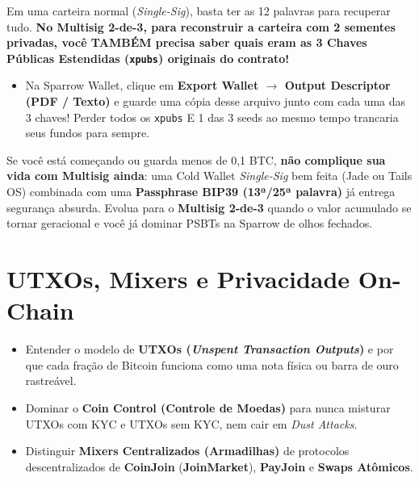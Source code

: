 \documentclass{pousadaguide}
\begin{document}
\begin{perigo}
Em uma carteira normal (\emph{Single-Sig}), basta ter as 12 palavras para recuperar tudo. \textbf{No Multisig 2-de-3, para reconstruir a carteira com 2 sementes privadas, você TAMBÉM precisa saber quais eram as 3 Chaves Públicas Estendidas (\texttt{xpubs}) originais do contrato!}
\begin{itemize}
  \item Na Sparrow Wallet, clique em \textbf{Export Wallet $\to$ Output Descriptor (PDF / Texto)} e guarde uma cópia desse arquivo junto com cada uma das 3 chaves! Perder todos os \texttt{xpubs} E 1 das 3 seeds ao mesmo tempo trancaria seus fundos para sempre.
\end{itemize}
\end{perigo}

\begin{dica}
Se você está começando ou guarda menos de 0,1 BTC, \textbf{não complique sua vida com Multisig ainda}: uma Cold Wallet \emph{Single-Sig} bem feita (Jade ou Tails OS) combinada com uma \textbf{Passphrase BIP39 (13ª/25ª palavra)} já entrega segurança absurda. Evolua para o \textbf{Multisig 2-de-3} quando o valor acumulado se tornar geracional e você já dominar PSBTs na Sparrow de olhos fechados.
\end{dica}

\chapter{UTXOs, Mixers e Privacidade On-Chain}

\begin{missao}
\begin{itemize}
  \item Entender o modelo de \textbf{UTXOs (\emph{Unspent Transaction Outputs})} e por que cada fração de Bitcoin funciona como uma nota física ou barra de ouro rastreável.
  \item Dominar o \textbf{Coin Control (Controle de Moedas)} para nunca misturar UTXOs com KYC e UTXOs sem KYC, nem cair em \emph{Dust Attacks}.
  \item Distinguir \textbf{Mixers Centralizados (Armadilhas)} de protocolos descentralizados de \textbf{CoinJoin} (\textbf{JoinMarket}), \textbf{PayJoin} e \textbf{Swaps Atômicos}.
\end{itemize}
\end{missao}
\end{document}
